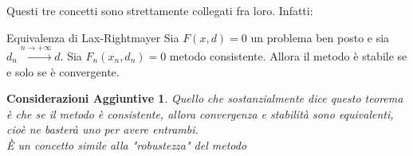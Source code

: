\documentclass[11pt,a4paper,twoside]{article}
\newtheorem*{cons}{Considerazioni Aggiuntive}
\theoremstyle{definition}
\begin{document}
Questi tre concetti sono strettamente collegati fra loro. Infatti:

\begin{thm}{Equivalenza di Lax-Rightmayer}{}
	Sia $F(x,d)=0$ un problema ben posto e sia $d_n \xrightarrow{n \to +\infty} d$. Sia $F_n(x_n, d_n) = 0$ metodo consistente. Allora il metodo è stabile se e solo se è convergente.
\end{thm}

\begin{cons}
	Quello che sostanzialmente dice questo teorema è che se il metodo è consistente, allora convergenza e stabilità sono equivalenti, cioè ne basterà uno per avere entrambi.\\
	È un concetto simile alla "robustezza" del metodo
\end{cons}
\end{document}
